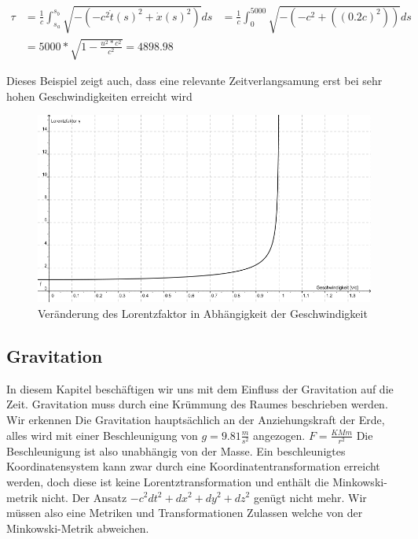\documentclass[]{article}
\begin{document}
	 \begin{align*}
	 	\tau
	 	&=
	 	\frac{1}{c}\int_{s_{a}}^{s_{b}}\sqrt{-(-c^2\dot{t}(s)^2+\dot{x}(s)^2)}ds
	 	&=
	 	\frac{1}{c}\int_{0}^{5000}\sqrt{-(-c^2+((0.2c)^2))}ds\\
	 	&=
	 	5000*\sqrt{1-\frac{u^2*c^2}{c^2}} = 4898.98
	 \end{align*}
	 
	 Dieses Beispiel zeigt auch, dass eine relevante Zeitverlangsamung erst bei sehr hohen Geschwindigkeiten erreicht wird
	 
	 \begin{figure}
	 	\centering
	 	\includegraphics[width=\hsize]{Lorentzfaktor.jpg}
	 	\caption{Ver\"anderung des Lorentzfaktor in Abh\"angigkeit der Geschwindigkeit%
	 		\label{skript:geodaten:fig:transport}}
	 	\end{figure}
	 
\subsection{Gravitation}
	
	In diesem Kapitel beschäftigen wir uns mit dem Einfluss der Gravitation auf die Zeit. Gravitation muss durch eine Krümmung des Raumes beschrieben werden. Wir erkennen Die Gravitation hauptsächlich an der Anziehungskraft der Erde, alles wird mit einer Beschleunigung von $g=9.81\frac{m}{s^2}$ angezogen. $F=\frac{KMm}{r^2}$
	Die Beschleunigung ist also unabhängig von der Masse.
	Ein beschleunigtes Koordinatensystem kann zwar durch eine Koordinatentransformation erreicht werden, doch diese ist keine Lorentztransformation und enthält die Minkowski-metrik nicht. Der Ansatz $ -c^2dt^2 + dx^2 + dy^2 + dz^2$ genügt nicht mehr. Wir müssen also eine Metriken und Transformationen Zulassen welche von der Minkowski-Metrik abweichen. 
	
\end{document}

